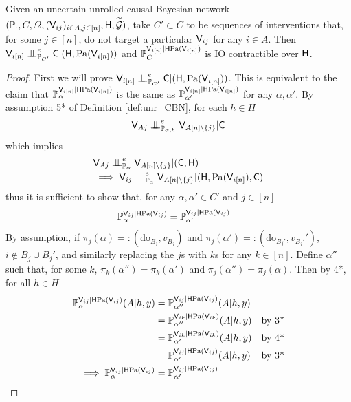 \begin{theorem}\label{th:causal_contractibility_cbn}
Given an uncertain unrolled causal Bayesian network $(\mathbb{P}_\cdot,C,\Omega,(\mathsf{V}_{ij})_{i\in A,j\in [n]},\mathsf{H},\overset{\sim}{\mathcal{G}})$, take $C'\subset C$ to be sequences of interventions that, for some $j\in [n]$, do not target a particular $\mathsf{V}_{ij}$ for any $i\in A$. Then $\RV{V}_{i[n]}\CI^e_{\prob{P}_{C'}}\RV{C}|(\RV{H},\mathrm{Pa}(\RV{V}_{i [n]}))$ and $\mathbb{P}_C^{\mathsf{V}_{i[n]}|\mathsf{H}\mathrm{Pa}(\mathsf{V}_{i [n]})}$ is IO contractible over $\mathsf{H}$. 
\end{theorem}

\begin{proof}
First we will prove $\RV{V}_{i[n]}\CI^e_{\prob{P}_{C'}}\RV{C}|(\RV{H},\mathrm{Pa}(\RV{V}_{i [n]}))$. This is equivalent to the claim that $\mathbb{P}_\alpha^{\mathsf{V}_{i[n]}|\mathsf{H}\mathrm{Pa}(\mathsf{V}_{i[n]})}$ is the same as $\mathbb{P}_{\alpha'}^{\mathsf{V}_{i[n]}|\mathsf{H}\mathrm{Pa}(\mathsf{V}_{i[n]})}$ for any $\alpha,\alpha'$. By assumption 5* of Definition \ref{def:unr_CBN}, for each $h\in H$
\begin{align}
    \RV{V}_{Aj}\CI^e_{\prob{P}_{\alpha,h}} \RV{V}_{A [n]\setminus\{j\}} |\RV{C}
\end{align}
which implies
\begin{align}
    &\RV{V}_{Aj}\CI^e_{\prob{P}_{\alpha}} \RV{V}_{A [n]\setminus\{j\}} |(\RV{C},\RV{H})\\
    &\implies \RV{V}_{ij}\CI^e_{\prob{P}_{\alpha}} \RV{V}_{A [n]\setminus\{j\}} |(\RV{H},\mathrm{Pa}(\RV{V}_{i[n]}),\RV{C})\label{eq:mutual_conditional_independence}
\end{align}
thus it is sufficient to show that, for any $\alpha,\alpha'\in C'$ and $j\in[n]$
\begin{align}
    \mathbb{P}_\alpha^{\mathsf{V}_{ij}|\mathsf{H}\mathrm{Pa}(\mathsf{V}_{ij})} &= \mathbb{P}_{\alpha'}^{\mathsf{V}_{ij}|\mathsf{H}\mathrm{Pa}(\mathsf{V}_{ij})}
\end{align}
By assumption, if $\pi_j(\alpha) =: (\mathrm{do}_{B_j},v_{B_j})$ and $\pi_j(\alpha') =: (\mathrm{do}_{B_j'},v_{B_j'}')$, $i\not\in B_j\cup B_j'$, and similarly replacing the $j$s with $k$s for any $k\in [n]$. Define $\alpha''$ such that, for some $k$, $\pi_k(\alpha'')=\pi_k(\alpha')$ and $\pi_j(\alpha'')=\pi_j(\alpha)$. Then by 4*, for all $h\in H$
\begin{align}
    \mathbb{P}_{\alpha}^{\mathsf{V}_{ij}|\mathsf{H}\mathrm{Pa}(\mathsf{V}_{ij})}(A|h,y) &= \mathbb{P}_{\alpha''}^{\mathsf{V}_{ij}|\mathsf{H}\mathrm{Pa}(\mathsf{V}_{ij})}(A|h,y)\\
    &= \mathbb{P}_{\alpha''}^{\mathsf{V}_{ik}|\mathsf{H}\mathrm{Pa}(\mathsf{V}_{ik})}(A|h,y)&\text{by 3*}\\
    &= \mathbb{P}_{\alpha'}^{\mathsf{V}_{ik}|\mathsf{H}\mathrm{Pa}(\mathsf{V}_{ik})}(A|h,y)&\text{by 4*}\\
    &= \mathbb{P}_{\alpha'}^{\mathsf{V}_{ij}|\mathsf{H}\mathrm{Pa}(\mathsf{V}_{ij})}(A|h,y)&\text{by 3*}\\
    \implies \mathbb{P}_\alpha^{\mathsf{V}_{ij}|\mathsf{H}\mathrm{Pa}(\mathsf{V}_{ij})} &= \mathbb{P}_{\alpha'}^{\mathsf{V}_{ij}|\mathsf{H}\mathrm{Pa}(\mathsf{V}_{ij})}
\end{align}


\end{proof}
